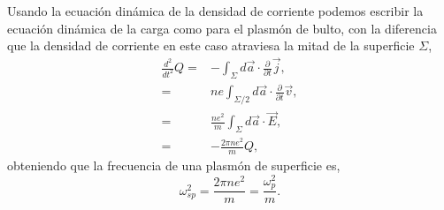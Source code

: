 \documentclass[12pt]{article}
\begin{document}
Usando la ecuación dinámica de la densidad de corriente podemos
escribir la ecuación dinámica de la carga como para el plasmón de
bulto, con la diferencia que la densidad de corriente en este caso
atraviesa la mitad de la superficie $\Sigma $,
\begin{equation}
  \begin{split}
    \frac{d^{2}}{dt^{2}}Q = & -\int_{\Sigma}d\vec{a}\cdot\frac{\partial}{\partial t}\vec{j},\\
    = & ne \int_{\Sigma/2}d\vec{a}\cdot\frac{\partial}{\partial t}\vec{v},\\
    = & \frac{ne^{2}}{m}\int_{\Sigma}d\vec{a}\cdot \vec{E}, \\
    = & -\frac{2\pi ne^{2}}{m}Q,
  \end{split}
\end{equation}
obteniendo que la frecuencia de una plasmón de superficie es,
\begin{equation}
  \omega_{sp}^{2}=\frac{2\pi ne^{2}}{m} = \frac{\omega_{p}^{2}}{m}.
  \label{surfaceplasmonfrecuency}
\end{equation}
\end{document}
